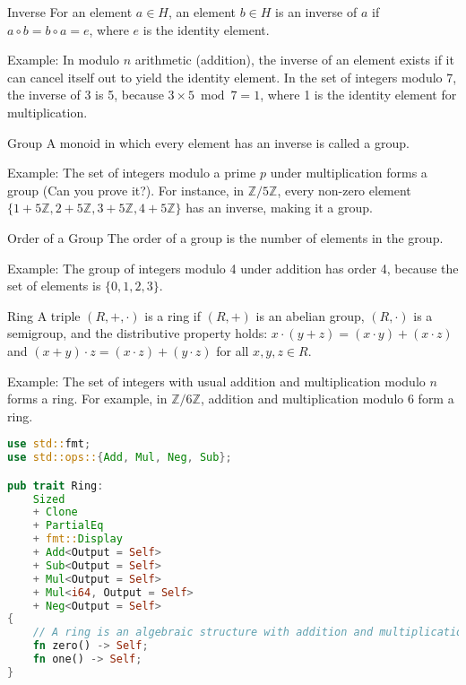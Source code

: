 \documentclass{article}
\begin{document}
\begin{definition}{Inverse}{}
For an element $a \in H$, an element $b \in H$ is an inverse of $a$ if $a \circ b = b \circ a = e$, where $e$ is the identity element.
\end{definition}

Example: In modulo $n$ arithmetic (addition), the inverse of an element exists if it can cancel itself out to yield the identity element. In the set of integers modulo 7, the inverse of 3 is 5, because $3 \times 5 \bmod 7 = 1$, where 1 is the identity element for multiplication.

\begin{definition}{Group}{}
A monoid in which every element has an inverse is called a group.
\end{definition}

Example: The set of integers modulo a prime $p$ under multiplication forms a group (Can you prove it?). For instance, in $\mathbb{Z}/5\mathbb{Z}$, every non-zero element $\{1 + 5\mathbb{Z}, 2 + 5\mathbb{Z}, 3 + 5\mathbb{Z}, 4 + 5\mathbb{Z}\}$ has an inverse, making it a group.

\begin{definition}{Order of a Group}{}
The order of a group is the number of elements in the group.
\end{definition}

Example: The group of integers modulo 4 under addition has order 4, because the set of elements is $\{0, 1, 2, 3\}$.

\begin{definition}{Ring}{}
A triple $(R, +, \cdot)$ is a ring if $(R, +)$ is an abelian group, $(R, \cdot)$ is a semigroup, and the distributive property holds: $x \cdot (y + z) = (x \cdot y) + (x \cdot z)$ and $(x + y) \cdot z = (x \cdot z) + (y \cdot z)$ for all $x, y, z \in R$.
\end{definition}

Example: The set of integers with usual addition and multiplication modulo $n$ forms a ring. For example, in $\mathbb{Z}/6\mathbb{Z}$, addition and multiplication modulo 6 form a ring.

\begin{lstlisting}[language=Rust, caption=Implementation of Ring]
use std::fmt;
use std::ops::{Add, Mul, Neg, Sub};

pub trait Ring:
    Sized
    + Clone
    + PartialEq
    + fmt::Display
    + Add<Output = Self>
    + Sub<Output = Self>
    + Mul<Output = Self>
    + Mul<i64, Output = Self>
    + Neg<Output = Self>
{
    // A ring is an algebraic structure with addition and multiplication
    fn zero() -> Self;
    fn one() -> Self;
}
\end{lstlisting}
\end{document}
